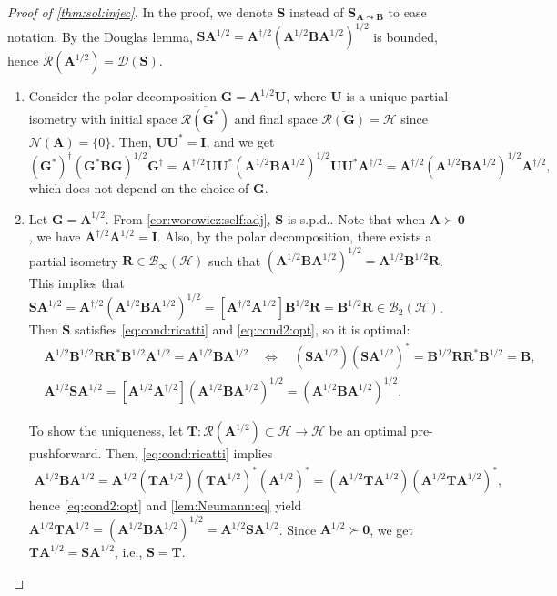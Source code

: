 \documentclass[noinfoline]{imsart}\setcounter{tocdepth}{2}
\newcommand{\m}[1]{\mathbf{#1}} %
\renewcommand{\c}[1]{\mathcal{#1}} %
\theoremstyle{plain}
\begin{document}
\begin{proof}[Proof of \cref{thm:sol:injec}]
In the proof, we denote $\m{S}$ instead of $\m{S}_{\m{A} \leadsto \m{B}}$ to ease notation. By the Douglas lemma, $\m{S} \m{A}^{1/2} = \m{A}^{\dagger/2} (\m{A}^{1/2} \m{B} \m{A}^{1/2})^{1/2}$ is bounded, hence $\c{R}(\m{A}^{1/2}) = \c{D}(\m{S})$. 


\begin{enumerate}[leftmargin = *]
\item Consider the polar decomposition $\m{G} = \m{A}^{1/2} \m{U}$, where $\m{U}$ is a unique partial isometry with initial space $\overline{\c{R}(\m{G}^{*})}$ and final space $\overline{\c{R}(\m{G})} = \c{H}$ since $\c{N}(\m{A})=\{0\}$. Then, $\m{U} \m{U}^{*} = \m{I}$, and we get 
\begin{equation*}
    (\m{G}^{*})^{\dagger} (\m{G}^{*} \m{B} \m{G})^{1/2} \m{G}^{\dagger} = \m{A}^{\dagger/2} \m{U} \m{U}^{*} (\m{A}^{1/2} \m{B} \m{A}^{1/2})^{1/2} \m{U} \m{U}^{*} \m{A}^{\dagger/2} = \m{A}^{\dagger/2} (\m{A}^{1/2} \m{B} \m{A}^{1/2})^{1/2} \m{A}^{\dagger/2},
\end{equation*}
which does not depend on the choice of $\m{G}$.

\item Let $\m{G} = \m{A}^{1/2}$. From \cref{cor:worowicz:self:adj}, $\m{S}$ is s.p.d.. Note that when $\m{A} \succ \m{0}$, we have $\m{A}^{\dagger/2} \m{A}^{1/2} = \m{I}$. Also, by the polar decomposition, there exists a partial isometry $\m{R} \in \c{B}_{\infty}(\c{H})$ such that $(\m{A}^{1/2} \m{B} \m{A}^{1/2})^{1/2} = \m{A}^{1/2} \m{B}^{1/2} \m{R}$. This implies that $\m{S} \m{A}^{1/2} = \m{A}^{\dagger/2} (\m{A}^{1/2} \m{B} \m{A}^{1/2})^{1/2} = [\m{A}^{\dagger/2} \m{A}^{1/2}] \m{B}^{1/2} \m{R} = \m{B}^{1/2} \m{R} \in \c{B}_{2}(\c{H})$. Then $\m{S}$ satisfies \eqref{eq:cond:ricatti} and \eqref{eq:cond2:opt}, so it is optimal:
\begin{align*}
    &\m{A}^{1/2} \m{B}^{1/2} \m{R} \m{R}^{*} \m{B}^{1/2} \m{A}^{1/2} = \m{A}^{1/2} \m{B} \m{A}^{1/2} \quad \Longleftrightarrow \quad (\m{S} \m{A}^{1/2}) (\m{S} \m{A}^{1/2})^{*} = \m{B}^{1/2} \m{R} \m{R}^{*} \m{B}^{1/2} = \m{B}, \\
    &\m{A}^{1/2} \m{S} \m{A}^{1/2} = [\m{A}^{1/2} \m{A}^{\dagger/2}] (\m{A}^{1/2} \m{B} \m{A}^{1/2})^{1/2} = (\m{A}^{1/2} \m{B} \m{A}^{1/2})^{1/2}.
\end{align*}

To show the uniqueness, let $\m{T}: \c{R}(\m{A}^{1/2}) \subset \c{H} \rightarrow \c{H}$ be an optimal pre-pushforward. Then, \eqref{eq:cond:ricatti} implies
\begin{align*}
    \m{A}^{1/2} \m{B} \m{A}^{1/2} = \m{A}^{1/2} (\m{T} \m{A}^{1/2}) (\m{T} \m{A}^{1/2})^{*} (\m{A}^{1/2})^{*} = (\m{A}^{1/2} \m{T} \m{A}^{1/2}) (\m{A}^{1/2} \m{T} \m{A}^{1/2})^{*},
\end{align*}
hence \eqref{eq:cond2:opt} and \cref{lem:Neumann:eq} yield $\m{A}^{1/2} \m{T} \m{A}^{1/2} = (\m{A}^{1/2} \m{B} \m{A}^{1/2})^{1/2} = \m{A}^{1/2} \m{S} \m{A}^{1/2}$. Since $\m{A}^{1/2} \succ \m{0}$, we get $\m{T} \m{A}^{1/2} = \m{S} \m{A}^{1/2}$, i.e., $\m{S} = \m{T}$.


\end{enumerate}
\end{proof}
\end{document}
